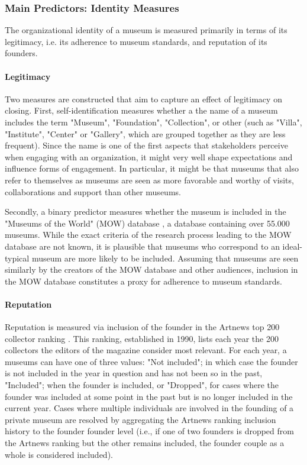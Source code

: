 \documentclass[12pt]{article}
\begin{document}
\subsubsection*{Main Predictors: Identity Measures}


The organizational identity of a museum is measured primarily in terms of its legitimacy, i.e. its adherence to museum standards, and reputation of its founders.

\paragraph*{Legitimacy}


Two measures are constructed that aim to capture an effect of legitimacy on closing.
First, self-identification measures whether a the name of a museum includes the term "Museum", "Foundation", "Collection", or other (such as "Villa", "Institute", "Center" or "Gallery", which are grouped together as they are less frequent).
Since the name is one of the first aspects that stakeholders perceive when engaging with an organization, it might very well shape expectations and influence forms of engagement.
In particular, it might be that museums that also refer to themselves as museums are seen as more favorable and worthy of visits, collaborations and support than other museums.


Secondly, a binary predictor measures whether the museum is included in the "Museums of the World" (MOW) database \parencite{deGruyter_2021_MOW}, a database containing over 55.000 museums.
While the exact criteria of the research process leading to the MOW database are not known, it is plausible that museums who correspond to an ideal-typical museum are more likely to be included.
Assuming that museums are seen similarly by the creators of the MOW database and other audiences, inclusion in the MOW database constitutes a proxy for adherence to museum standards. 


\paragraph*{Reputation}


Reputation is measured via inclusion of the founder in the Artnews top 200 collector ranking \parencite{Artnews_ranking}.
This ranking, established in 1990, lists each year the 200 collectors the editors of the magazine consider most relevant.
For each year, a museums can have one of three values: "Not included"; in which case the founder is not included in the year in question and has not been so in the past, "Included"; when the founder is included, or "Dropped", for cases where the founder was included at some point in the past but is no longer included in the current year.
Cases where multiple individuals are involved in the founding of a private museum are resolved by aggregating the Artnews ranking inclusion history to the founder founder level (i.e., if one of two founders is dropped from the Artnews ranking but the other remains included, the founder couple as a whole is considered included).
\end{document}
